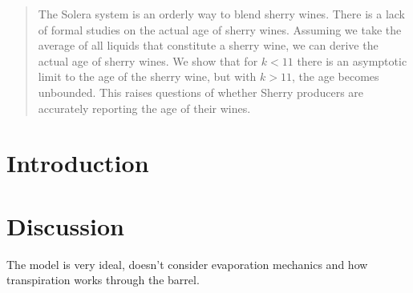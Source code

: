 \documentclass{article}
\begin{document}
\maketitle

\begin{abstract}
  The Solera system is an orderly way to blend sherry wines.
  There is a lack of formal studies on the actual age of sherry wines.
  Assuming we take the average of all liquids that constitute a sherry wine, we can derive the actual age of sherry wines.
  We show that for $k < 11$ there is an asymptotic limit to the age of the sherry wine, but with $k > 11$, the age becomes unbounded.
  This raises questions of whether Sherry producers are accurately reporting the age of their wines.
\end{abstract}


\section{Introduction}

\section{Discussion}
The model is very ideal, doesn't consider evaporation mechanics and how transpiration works through the barrel.




\appendix
\end{document}
